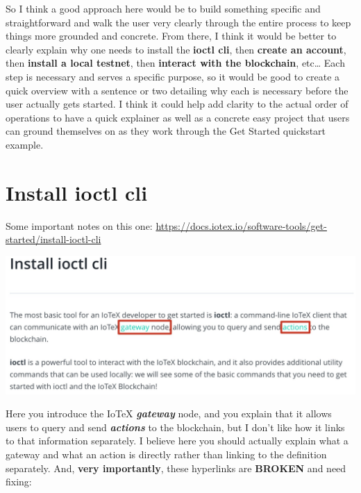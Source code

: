 \documentclass[
]{book}
\begin{document}
So I think a good approach here would be to build something specific and
straightforward and walk the user very clearly through the entire
process to keep things more grounded and concrete. From there, I think
it would be better to clearly explain why one needs to install the
\textbf{ioctl cli}, then \textbf{create an account}, then
\textbf{install a local testnet}, then \textbf{interact with the
blockchain}, etc\ldots{} Each step is necessary and serves a specific
purpose, so it would be good to create a quick overview with a sentence
or two detailing why each is necessary before the user actually gets
started. I think it could help add clarity to the actual order of
operations to have a quick explainer as well as a concrete easy project
that users can ground themselves on as they work through the Get Started
quickstart example.

\hypertarget{install-ioctl-cli}{%
\section{Install ioctl cli}\label{install-ioctl-cli}}

Some important notes on this one:
\url{https://docs.iotex.io/software-tools/get-started/install-ioctl-cli}

\includegraphics[width=8.33333in,height=\textheight]{images/install_cli.jpg}

Here you introduce the IoTeX \textbf{\emph{gateway}} node, and you
explain that it allows users to query and send \textbf{\emph{actions}}
to the blockchain, but I don't like how it links to that information
separately. I believe here you should actually explain what a gateway
and what an action is directly rather than linking to the definition
separately. And, \textbf{very importantly}, these hyperlinks are
\textbf{BROKEN} and need fixing:
\end{document}
